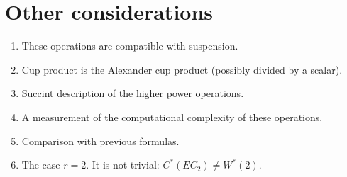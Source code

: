 
\section{Other considerations}

\begin{enumerate}
	\item These operations are compatible with suspension.
	\item Cup product is the Alexander cup product (possibly divided by a scalar).
	\item Succint description of the higher power operations.
	\item A measurement of the computational complexity of these operations.
	\item Comparison with previous formulas.
	\item The case $r=2$. It is not trivial: $C^*(EC_2)\neq W^*(2)$.
\end{enumerate}